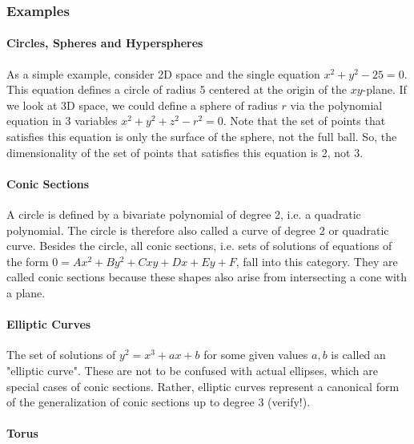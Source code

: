 \subsubsection{Examples}

\paragraph{Circles, Spheres and Hyperspheres}
As a simple example, consider 2D space and the single equation $x^2 + y^2 - 25 = 0$. This equation defines a circle of radius $5$ centered at the origin of the $xy$-plane. If we look at 3D space, we could define a sphere of radius $r$ via the polynomial equation in 3 variables $x^2 + y^2 + z^2 - r^2 = 0$. Note that the set of points that satisfies this equation is only the surface of the sphere, not the full ball. So, the dimensionality of the set of points that satisfies this equation is 2, not 3. 

\paragraph{Conic Sections}
A circle is defined by a bivariate polynomial of degree 2, i.e. a quadratic polynomial. The circle is therefore also called a curve of degree 2 or quadratic curve. Besides the circle, all conic sections, i.e. sets of solutions of equations of the form $0 = A x^2 + B y^2 + C x y + D x + E y + F$, fall into this category. They are called conic sections because these shapes also arise from intersecting a cone with a plane.

\paragraph{Elliptic Curves}
The set of solutions of $y^2 = x^3 + a x + b$ for some given values $a,b$ is called an "elliptic curve". These are not to be confused with actual ellipses, which are special cases of conic sections. Rather, elliptic curves represent a canonical form of the generalization of conic sections up to degree 3 (verify!).



\paragraph{Torus}


